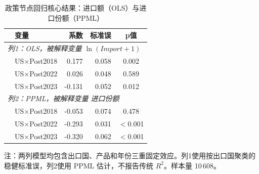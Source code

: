 \begin{table}[H]
\centering
\caption{政策节点回归核心结果：进口额（OLS）与进口份额（PPML）}
\label{tab:regression}
\begin{tabular}{llrrc}
\toprule
 & 变量 & 系数 & 标准误 & p值 \\
\midrule
\multicolumn{5}{l}{\textit{列1：OLS，被解释变量 $\ln(Import+1)$}} \\
 & US$\times$Post2018 & 0.177 & 0.058 & 0.002 \\
 & US$\times$Post2022 & 0.026 & 0.048 & 0.589 \\
 & US$\times$Post2023 & -0.131 & 0.052 & 0.012 \\
\midrule
\multicolumn{5}{l}{\textit{列2：PPML，被解释变量 进口份额}} \\
 & US$\times$Post2018 & -0.053 & 0.074 & 0.478 \\
 & US$\times$Post2022 & -0.293 & 0.031 & $<$0.001 \\
 & US$\times$Post2023 & -0.320 & 0.062 & $<$0.001 \\
\bottomrule
\end{tabular}

\vspace{0.5em}
\begin{minipage}{0.92\linewidth}
\footnotesize
注：两列模型均包含出口国、产品和年份三重固定效应。列1使用按出口国聚类的稳健标准误，列2使用 PPML 估计，不报告传统 $R^2$。样本量 10\,608。
\end{minipage}
\end{table}
